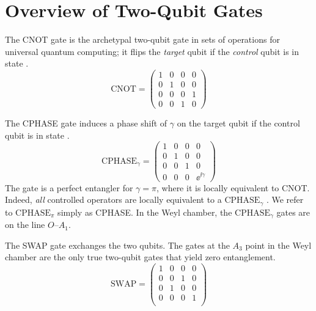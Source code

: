 \chapter{Overview of Two-Qubit Gates}
\label{AppendixGates}

  The CNOT gate is the archetypal two-qubit gate in sets of operations for
  universal quantum computing; it flips the \emph{target} qubit if
  the \emph{control} qubit is in state .
  \begin{equation}
  \text{CNOT} =
    \begin{pmatrix}
    1 & 0 & 0 & 0 \\
    0 & 1 & 0 & 0 \\
    0 & 0 & 0 & 1 \\
    0 & 0 & 1 & 0
    \end{pmatrix}
  \end{equation}

  The CPHASE gate induces a phase shift of $\gamma$ on the target qubit if the
  control qubit is in state .
  \begin{equation}
  \text{CPHASE}_{\gamma} =
    \begin{pmatrix}
    1 & 0 & 0 & 0 \\
    0 & 1 & 0 & 0 \\
    0 & 0 & 1 & 0 \\
    0 & 0 & 0 & \ee^{\ii \gamma}
    \end{pmatrix}
  \end{equation}
  The gate is a perfect entangler for $\gamma=\pi$, where it is locally
  equivalent to CNOT. Indeed, \emph{all} controlled operators are locally
  equivalent to a $\text{CPHASE}_{\gamma}$ \cite{ZhangPRA03}. We refer to
  $\text{CPHASE}_{\pi}$ simply as CPHASE. In the Weyl chamber, the
  $\text{CPHASE}_{\gamma}$ gates are on the line $O$--$A_1$.

  The SWAP gate exchanges the two qubits. The gates at the $A_3$ point in the
  Weyl chamber are the only true two-qubit gates that yield zero entanglement.
  \begin{equation}
  \text{SWAP} =
    \begin{pmatrix}
    1 & 0 & 0 & 0 \\
    0 & 0 & 1 & 0 \\
    0 & 1 & 0 & 0 \\
    0 & 0 & 0 & 1 \\
    \end{pmatrix}
  \end{equation}

